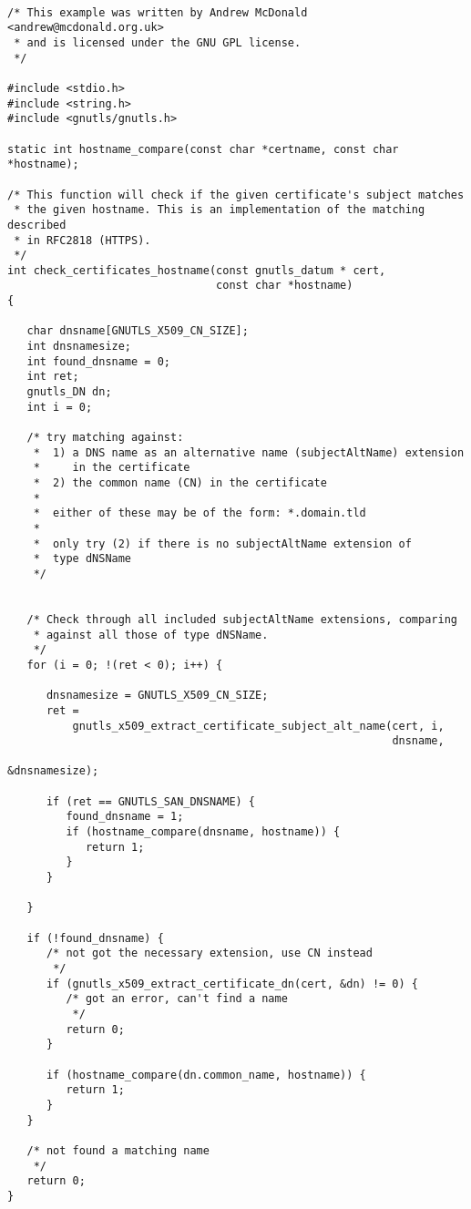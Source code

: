 \begin{verbatim}

/* This example was written by Andrew McDonald <andrew@mcdonald.org.uk>
 * and is licensed under the GNU GPL license.
 */

#include <stdio.h>
#include <string.h>
#include <gnutls/gnutls.h>

static int hostname_compare(const char *certname, const char *hostname);

/* This function will check if the given certificate's subject matches
 * the given hostname. This is an implementation of the matching described
 * in RFC2818 (HTTPS).
 */
int check_certificates_hostname(const gnutls_datum * cert,
                                const char *hostname)
{

   char dnsname[GNUTLS_X509_CN_SIZE];
   int dnsnamesize;
   int found_dnsname = 0;
   int ret;
   gnutls_DN dn;
   int i = 0;

   /* try matching against:
    *  1) a DNS name as an alternative name (subjectAltName) extension
    *     in the certificate
    *  2) the common name (CN) in the certificate
    *
    *  either of these may be of the form: *.domain.tld
    *
    *  only try (2) if there is no subjectAltName extension of
    *  type dNSName
    */


   /* Check through all included subjectAltName extensions, comparing
    * against all those of type dNSName.
    */
   for (i = 0; !(ret < 0); i++) {

      dnsnamesize = GNUTLS_X509_CN_SIZE;
      ret =
          gnutls_x509_extract_certificate_subject_alt_name(cert, i,
                                                           dnsname,
                                                           &dnsnamesize);

      if (ret == GNUTLS_SAN_DNSNAME) {
         found_dnsname = 1;
         if (hostname_compare(dnsname, hostname)) {
            return 1;
         }
      }

   }

   if (!found_dnsname) {
      /* not got the necessary extension, use CN instead 
       */
      if (gnutls_x509_extract_certificate_dn(cert, &dn) != 0) {
         /* got an error, can't find a name 
          */
         return 0;
      }

      if (hostname_compare(dn.common_name, hostname)) {
         return 1;
      }
   }

   /* not found a matching name
    */
   return 0;
}


\end{verbatim}
